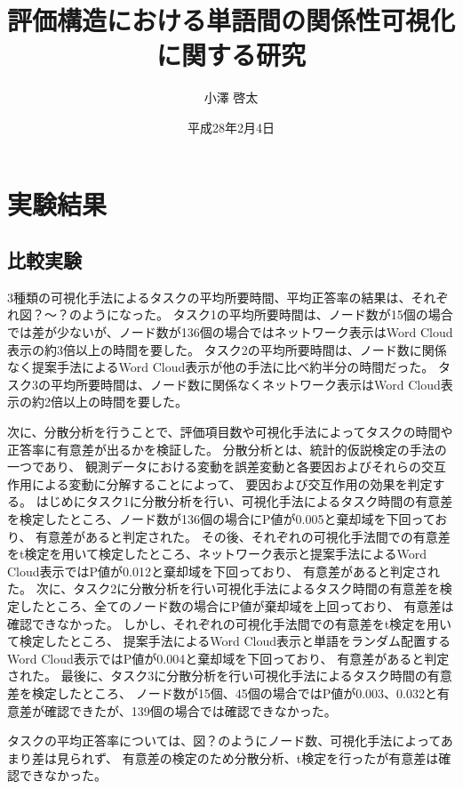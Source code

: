 \documentclass[syuuron]{kuee}
\title{評価構造における単語間の関係性可視化に関する研究}
\author{小澤 啓太}
\date{平成28年2月4日}
\begin{document}
\maketitle
\tableofcontents


\chapter{実験結果}
	\section{比較実験}
	3種類の可視化手法によるタスクの平均所要時間、平均正答率の結果は、それぞれ図？～？のようになった。
	タスク1の平均所要時間は、ノード数が15個の場合では差が少ないが、ノード数が136個の場合ではネットワーク表示はWord Cloud表示の約3倍以上の時間を要した。
	タスク2の平均所要時間は、ノード数に関係なく提案手法によるWord Cloud表示が他の手法に比べ約半分の時間だった。
	タスク3の平均所要時間は、ノード数に関係なくネットワーク表示はWord Cloud表示の約2倍以上の時間を要した。
	
	次に、分散分析を行うことで、評価項目数や可視化手法によってタスクの時間や正答率に有意差が出るかを検証した。
	分散分析とは、統計的仮説検定の手法の一つであり、
	観測データにおける変動を誤差変動と各要因およびそれらの交互作用による変動に分解することによって、
	要因および交互作用の効果を判定する。
	はじめにタスク1に分散分析を行い、可視化手法によるタスク時間の有意差を検定したところ、ノード数が136個の場合にP値が0.005と棄却域を下回っており、
	有意差があると判定された。
	その後、それぞれの可視化手法間での有意差をt検定を用いて検定したところ、ネットワーク表示と提案手法によるWord Cloud表示ではP値が0.012と棄却域を下回っており、
	有意差があると判定された。
	次に、タスク2に分散分析を行い可視化手法によるタスク時間の有意差を検定したところ、全てのノード数の場合にP値が棄却域を上回っており、
	有意差は確認できなかった。
	しかし、それぞれの可視化手法間での有意差をt検定を用いて検定したところ、
	提案手法によるWord Cloud表示と単語をランダム配置するWord Cloud表示ではP値が0.004と棄却域を下回っており、
	有意差があると判定された。
	最後に、タスク3に分散分析を行い可視化手法によるタスク時間の有意差を検定したところ、
	ノード数が15個、45個の場合ではP値が0.003、0.032と有意差が確認できたが、139個の場合では確認できなかった。
	
	タスクの平均正答率については、図？のようにノード数、可視化手法によってあまり差は見られず、
	有意差の検定のため分散分析、t検定を行ったが有意差は確認できなかった。
		
\end{document}
